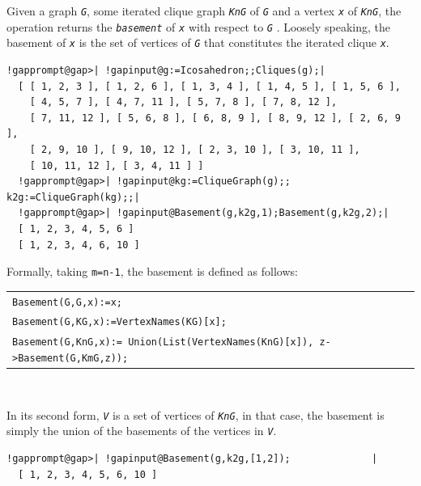 \documentclass[a4paper,11pt]{report}
\begin{document}
{{{ 

Given a graph \mbox{\texttt{\mdseries\slshape G}}, some iterated clique graph \mbox{\texttt{\mdseries\slshape KnG}} of \mbox{\texttt{\mdseries\slshape G}} and a vertex \mbox{\texttt{\mdseries\slshape x}} of \mbox{\texttt{\mdseries\slshape KnG}}, the operation returns the \mbox{\texttt{\mdseries\slshape basement}} of \mbox{\texttt{\mdseries\slshape x}} with respect to \mbox{\texttt{\mdseries\slshape G}} \cite{Piz04}. Loosely speaking, the basement of \mbox{\texttt{\mdseries\slshape x}} is the set of vertices of \mbox{\texttt{\mdseries\slshape G}} that constitutes the iterated clique \mbox{\texttt{\mdseries\slshape x}}. 


\begin{Verbatim}[commandchars=!@|,fontsize=\small,frame=single,label=Example]
  !gapprompt@gap>| !gapinput@g:=Icosahedron;;Cliques(g);|
  [ [ 1, 2, 3 ], [ 1, 2, 6 ], [ 1, 3, 4 ], [ 1, 4, 5 ], [ 1, 5, 6 ], 
    [ 4, 5, 7 ], [ 4, 7, 11 ], [ 5, 7, 8 ], [ 7, 8, 12 ], 
    [ 7, 11, 12 ], [ 5, 6, 8 ], [ 6, 8, 9 ], [ 8, 9, 12 ], [ 2, 6, 9 ], 
    [ 2, 9, 10 ], [ 9, 10, 12 ], [ 2, 3, 10 ], [ 3, 10, 11 ], 
    [ 10, 11, 12 ], [ 3, 4, 11 ] ]
  !gapprompt@gap>| !gapinput@kg:=CliqueGraph(g);; k2g:=CliqueGraph(kg);;|
  !gapprompt@gap>| !gapinput@Basement(g,k2g,1);Basement(g,k2g,2);|
  [ 1, 2, 3, 4, 5, 6 ]
  [ 1, 2, 3, 4, 6, 10 ]
\end{Verbatim}
 

Formally, taking \texttt{m=n-1}, the basement is defined as follows: 

\begin{center}
\begin{tabular}{l}\texttt{Basement(G,G,x):=x;}\\
\texttt{Basement(G,KG,x):=VertexNames(KG)[x];}\\
\texttt{Basement(G,KnG,x):= Union(List(VertexNames(KnG)[x]),
z-{\textgreater}Basement(G,KmG,z));}\\
\end{tabular}\\[2mm]
\end{center}

 

In its second form, \mbox{\texttt{\mdseries\slshape V}} is a set of vertices of \mbox{\texttt{\mdseries\slshape KnG}}, in that case, the basement is simply the union of the basements of the
vertices in \mbox{\texttt{\mdseries\slshape V}}. 


\begin{Verbatim}[commandchars=!@|,fontsize=\small,frame=single,label=Example]
  !gapprompt@gap>| !gapinput@Basement(g,k2g,[1,2]);              |
  [ 1, 2, 3, 4, 5, 6, 10 ]
\end{Verbatim}
 

}}}
\end{document}
